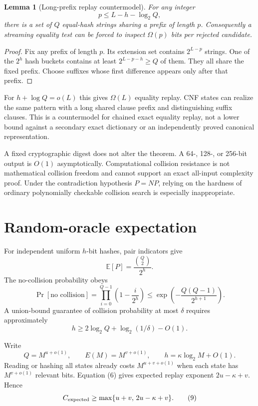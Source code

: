 \documentclass[11pt]{article}
\newtheorem{lemma}[theorem]{Lemma}
\begin{document}
\begin{lemma}[Long-prefix replay countermodel]
For any integer
\[
 p\le L-h-\log_2Q,
\]
there is a set of $Q$ equal-hash strings sharing a prefix of length $p$.
Consequently a streaming equality test can be forced to inspect
$\Omega(p)$ bits per rejected candidate.
\end{lemma}

\begin{proof}
Fix any prefix of length $p$.  Its extension set contains $2^{L-p}$ strings.
One of the $2^h$ hash buckets contains at least $2^{L-p-h}\ge Q$ of them.
They all share the fixed prefix.  Choose suffixes whose first difference
appears only after that prefix.
\end{proof}

For $h+\log Q=o(L)$ this gives $\Omega(L)$ equality replay.  CNF states can
realize the same pattern with a long shared clause prefix and distinguishing
suffix clauses.  This is a countermodel for chained exact equality replay,
not a lower bound against a secondary exact dictionary or an independently
proved canonical representation.

A fixed cryptographic digest does not alter the theorem.  A 64-, 128-, or
256-bit output is $O(1)$ asymptotically.  Computational collision resistance
is not mathematical collision freedom and cannot support an exact all-input
complexity proof.  Under the contradiction hypothesis $P=NP$, relying on the
hardness of ordinary polynomially checkable collision search is especially
inappropriate.

\section{Random-oracle expectation}

For independent uniform $h$-bit hashes, pair indicators give
\[
 \mathbb E[P]=\frac{\binom Q2}{2^h}.
 \tag{6}
\]
The no-collision probability obeys
\[
 \Pr[\text{no collision}]
 =\prod_{i=0}^{Q-1}\left(1-\frac{i}{2^h}\right)
 \le
 \exp\left(-\frac{Q(Q-1)}{2^{h+1}}\right).
 \tag{7}
\]
A union-bound guarantee of collision probability at most $\delta$ requires
approximately
\[
 h\ge2\log_2Q+\log_2(1/\delta)-O(1).
 \tag{8}
\]

Write
\[
 Q=M^{u+o(1)},\qquad E(M)=M^{v+o(1)},
 \qquad h=\kappa\log_2M+O(1).
\]
Reading or hashing all states already costs $M^{u+v+o(1)}$ when each state
has $M^{v+o(1)}$ relevant bits.  Equation (6) gives expected replay exponent
$2u-\kappa+v$.  Hence
\[
 C_{\rm expected}\ge
 \max\{u+v,\,2u-\kappa+v\}.
 \tag{9}
\]
\end{document}
